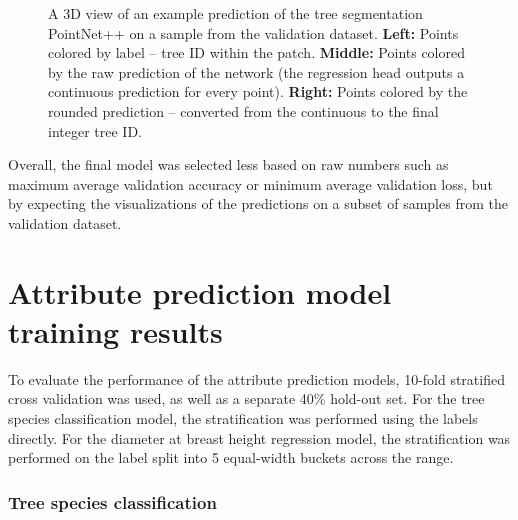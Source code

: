 \begin{figure}
\caption[A 3D view of an example prediction of the tree segmentation PointNet++.]{\label{fig-example-prediction-3d}A 3D view of an example
prediction of the tree segmentation PointNet++ on a sample from the
validation dataset. \textbf{Left:} Points colored by label -- tree ID
within the patch. \textbf{Middle:} Points colored by the raw prediction
of the network (the regression head outputs a continuous prediction for
every point). \textbf{Right:} Points colored by the rounded prediction
-- converted from the continuous to the final integer tree ID.}
\end{figure}

Overall, the final model was selected less based on raw numbers such as maximum average validation accuracy or minimum average validation loss, but by expecting the visualizations of the predictions on a subset of samples from the validation dataset.

\section{Attribute prediction model training results}

To evaluate the performance of the attribute prediction models, 10-fold stratified cross validation was used, as well as a separate 40\% hold-out set.
For the tree species classification model, the stratification was performed using the labels directly.
For the diameter at breast height regression model, the stratification was performed on the label split into 5 equal-width buckets across the range.

\subsubsection{Tree species classification}


